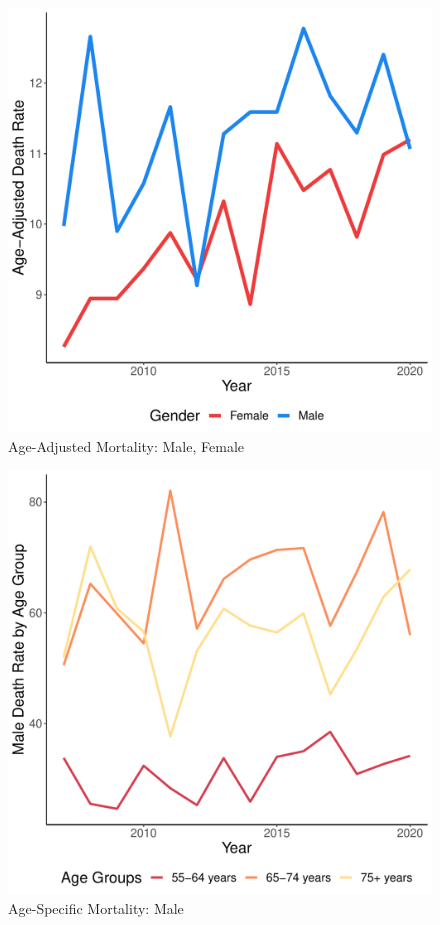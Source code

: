 \documentclass[12pt]{article}
\begin{document}
\begin{figure}
    \centering
    \includegraphics[scale=0.5]{analysis/output/age_adj_deaths_by_gender_plot.pdf}
    \caption{Age-Adjusted Mortality: Male, Female}
    \label{fig:age_adj_deaths_by_gender}
\end{figure}

\newpage

\begin{figure}
    \centering
    \includegraphics[scale=0.5]{analysis/output/male_age_specific_deaths_plot.pdf}
    \caption{Age-Specific Mortality: Male}
    \label{fig:male_age_specific_deaths}
\end{figure}
\end{document}
